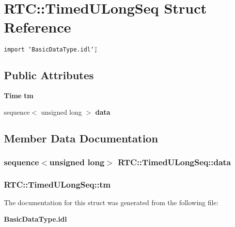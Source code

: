 \section{RTC::Timed\-ULong\-Seq Struct Reference}
\label{structRTC_1_1TimedULongSeq}
{\tt import \char`\"{}Basic\-Data\-Type.idl\char`\"{};}

\subsection*{Public Attributes}
\begin{CompactItemize}
\item 
{\bf Time} {\bf tm}
\item 
sequence$<$ unsigned long $>$ {\bf data}
\end{CompactItemize}


\subsection{Member Data Documentation}
\subsubsection{\setlength{\rightskip}{0pt plus 5cm}sequence$<$unsigned long$>$ {\bf RTC::Timed\-ULong\-Seq::data}}\label{structRTC_1_1TimedULongSeq_RTC_1_1TimedULongSeqo1}


\subsubsection{ {\bf RTC::Timed\-ULong\-Seq::tm}}\label{structRTC_1_1TimedULongSeq_RTC_1_1TimedULongSeqo0}




The documentation for this struct was generated from the following file:\begin{CompactItemize}
\item 
{\bf Basic\-Data\-Type.idl}\end{CompactItemize}
